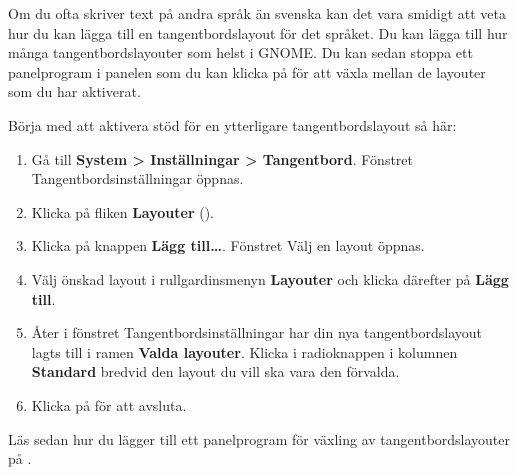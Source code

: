 \documentclass[a4paper,final]{memoir} %
\begin{document}
Om du ofta skriver text på andra språk än svenska kan det vara smidigt att veta hur du kan lägga till en tangentbordslayout för det språket. Du kan lägga till hur många tangentbordslayouter som helst i GNOME. Du kan sedan stoppa ett panelprogram i panelen som du kan klicka på för att växla mellan de layouter som du har aktiverat.

Börja med att aktivera stöd för en ytterligare tangentbordslayout så här:

\begin{enumerate}

\item Gå till \textbf{System \textgreater{} Inställningar \textgreater{} Tangentbord}. Fönstret Tangentbordsinställningar öppnas. 

\item Klicka på fliken \textbf{Layouter} ().


\item Klicka på knappen \textbf{Lägg till\ldots{}}. Fönstret Välj en layout öppnas.

\item Välj önskad layout i rullgardinsmenyn \textbf{Layouter} och klicka därefter på \textbf{Lägg till}.

\item Åter i fönstret Tangentbordsinställningar har din nya tangentbordslayout lagts till i ramen \textbf{Valda layouter}. Klicka i radioknappen i kolumnen \textbf{Standard} bredvid den layout du vill ska vara den förvalda.

\item Klicka på \xstang{} för att avsluta.

\end{enumerate}

Läs sedan hur du lägger till ett panelprogram för växling av tangentbordslayouter på .

\end{document}
